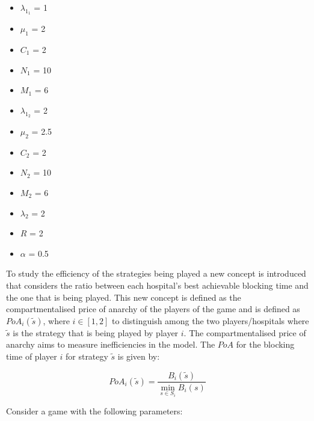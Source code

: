 \begin{multicols}{3}
    \begin{itemize}
        \item \( \lambda_{1_1} \) = 1
        \item \( \mu_1 \) = 2
        \item \( C_1 \) = 2
        \item \( N_1 \) = 10
        \item \( M_1 \) = 6

        \columnbreak
        \item \( \lambda_{1_2} \) = 2
        \item \( \mu_2 \) = 2.5
        \item \( C_2 \) = 2
        \item \( N_2 \) = 10
        \item \( M_2 \) = 6
        
        \columnbreak
        \item \( \lambda_2 \) = 2
        \item \( R \) = 2
        \item \( \alpha \) = 0.5
    \end{itemize}
\end{multicols}

To study the efficiency of the strategies being played a new concept is 
introduced that considers the ratio between each hospital's best achievable 
blocking time and the one that is being played.
This new concept is defined as the compartmentalised price of anarchy of the 
players of the game and is defined as \(PoA_i(\tilde{s})\), where 
\(i \in [1, 2]\) to distinguish among the two players/hospitals where 
\(\tilde{s}\) is the strategy that is being played by player \( i \). 
The compartmentalised price of anarchy aims to measure inefficiencies in the 
model.
The \(PoA\) for the blocking time of player \(i\) for strategy \(\tilde{s}\) 
is given by:

\begin{equation}\label{eq:poa_compartmentalised}
    PoA_{i}(\tilde{s}) = \frac{B_i(\tilde{s})}{\min_{s \in S_i} B_i(s)}
\end{equation}

Consider a game with the following parameters:

